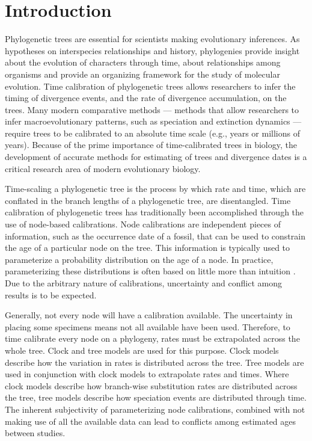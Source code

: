 \documentclass[]{article}
\begin{document}
\begin{center}
\end{center}
\section*{Introduction}
    Phylogenetic trees are essential for scientists making evolutionary inferences. As hypotheses on interspecies relationships and history, phylogenies provide insight about the evolution of characters through time, about relationships among organisms and provide an organizing framework for the study of molecular evolution. Time calibration of phylogenetic trees allows researchers to infer the timing of divergence events, and the rate of divergence accumulation, on the trees. Many modern comparative methods --- methods that allow researchers to infer macroevolutionary patterns, such as speciation and extinction dynamics --- require trees to be calibrated to an absolute time scale (e.g., years or millions of years). Because of the prime importance of time-calibrated trees in biology, the development of accurate methods for estimating of trees and divergence dates is a critical research area of modern evolutionary biology. \par
    Time-scaling a phylogenetic tree is the process by which rate and time, which are conflated in the branch lengths of a phylogenetic tree, are disentangled. Time calibration of phylogenetic trees has traditionally been accomplished through the use of node-based calibrations. Node calibrations are independent pieces of information, such as the occurrence date of a fossil, that can be used to constrain the age of a particular node on the tree. This information is typically used to parameterize a probability distribution on the age of a node.  In practice, parameterizing these distributions is often based on little more than intuition \citep{Heath01032012, Heath22072014}. Due to the arbitrary nature of calibrations, uncertainty and conflict among results is to be expected.  \par
Generally, not every node will have a calibration available. The uncertainty in placing some specimens means not all available have been used. Therefore, to time calibrate every node on a phylogeny, rates must be extrapolated across the whole tree. Clock and tree models are used for this purpose. Clock models describe how the variation in rates is distributed across the tree. Tree models are used in conjunction with clock models to extrapolate rates and times. Where clock models describe how branch-wise substitution rates are distributed across the tree, tree models describe how speciation events are distributed through time. The inherent subjectivity of parameterizing node calibrations, combined with not making use of all the available data can lead to conflicts among estimated ages between studies. \par
\end{document}
